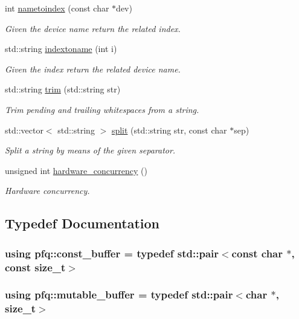 \begin{DoxyCompactItemize}
int \hyperlink{namespacepfq_ad66073cd0c09437436747515fcab1e43}{nametoindex} (const char $\ast$dev)
\begin{DoxyCompactList}\small\item\em Given the device name return the related index. \end{DoxyCompactList}\item 
std\+::string \hyperlink{namespacepfq_a092fadb4224e60ee17efb0553d982438}{indextoname} (int i)
\begin{DoxyCompactList}\small\item\em Given the index return the related device name. \end{DoxyCompactList}\item 
std\+::string \hyperlink{namespacepfq_a02a1861a64cc518394d3cc4361799c9f}{trim} (std\+::string str)
\begin{DoxyCompactList}\small\item\em Trim pending and trailing whitespaces from a string. \end{DoxyCompactList}\item 
std\+::vector$<$ std\+::string $>$ \hyperlink{namespacepfq_a0c3aeb61dfd544cb08cb240202caf213}{split} (std\+::string str, const char $\ast$sep)
\begin{DoxyCompactList}\small\item\em Split a string by means of the given separator. \end{DoxyCompactList}\item 
unsigned int \hyperlink{namespacepfq_a9a9e9be8b77976ed45483448f54de1f9}{hardware\+\_\+concurrency} ()
\begin{DoxyCompactList}\small\item\em Hardware concurrency. \end{DoxyCompactList}\end{DoxyCompactItemize}


\subsection{Typedef Documentation}
\hypertarget{namespacepfq_ac835a1bd09b4cbaba61c100b50d0a99f}{
\subsubsection[{const\+\_\+buffer}]{\setlength{\rightskip}{0pt plus 5cm}using {\bf pfq\+::const\+\_\+buffer} = typedef std\+::pair$<$const char $\ast$, const size\+\_\+t$>$}}\label{namespacepfq_ac835a1bd09b4cbaba61c100b50d0a99f}
\hypertarget{namespacepfq_ad7b88920eaf729154354741132483ea8}{
\subsubsection[{mutable\+\_\+buffer}]{\setlength{\rightskip}{0pt plus 5cm}using {\bf pfq\+::mutable\+\_\+buffer} = typedef std\+::pair$<$char $\ast$, size\+\_\+t$>$}}\label{namespacepfq_ad7b88920eaf729154354741132483ea8}


